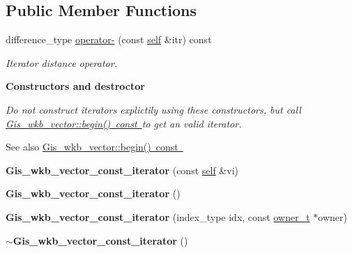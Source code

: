 \subsection*{Public Member Functions}
\begin{DoxyCompactItemize}
\item 
difference\+\_\+type \mbox{\hyperlink{classGis__wkb__vector__const__iterator_a9662de5243a456cb63a183214deba0af}{operator-\/}} (const \mbox{\hyperlink{classGis__wkb__vector__const__iterator}{self}} \&itr) const
\begin{DoxyCompactList}\small\item\em Iterator distance operator. \end{DoxyCompactList}\end{DoxyCompactItemize}
\begin{Indent}\textbf{ Constructors and destroctor}\par
{\em Do not construct iterators explictily using these constructors, but call \mbox{\hyperlink{classGis__wkb__vector_a312062fdc578f38fec1b07912f53963f}{Gis\+\_\+wkb\+\_\+vector\+::begin() const }}to get an valid iterator. \begin{DoxySeeAlso}{See also}
\mbox{\hyperlink{classGis__wkb__vector_a312062fdc578f38fec1b07912f53963f}{Gis\+\_\+wkb\+\_\+vector\+::begin() const }} 
\end{DoxySeeAlso}
}\begin{DoxyCompactItemize}
\item 
\mbox{\label{classGis__wkb__vector__const__iterator_afd819e196ee973846e1569cc48db967b}} 
{\bfseries Gis\+\_\+wkb\+\_\+vector\+\_\+const\+\_\+iterator} (const \mbox{\hyperlink{classGis__wkb__vector__const__iterator}{self}} \&vi)
\item 
\mbox{\label{classGis__wkb__vector__const__iterator_a97fff5959917c434cc921ad0cb8adbc2}} 
{\bfseries Gis\+\_\+wkb\+\_\+vector\+\_\+const\+\_\+iterator} ()
\item 
\mbox{\label{classGis__wkb__vector__const__iterator_a718c20de4cb1e57202f7312e689539c7}} 
{\bfseries Gis\+\_\+wkb\+\_\+vector\+\_\+const\+\_\+iterator} (index\+\_\+type idx, const \mbox{\hyperlink{classGis__wkb__vector}{owner\+\_\+t}} $\ast$owner)
\item 
\mbox{\label{classGis__wkb__vector__const__iterator_a69cd374f5be2ac20e56e1b2b3347bb66}} 
{\bfseries $\sim$\+Gis\+\_\+wkb\+\_\+vector\+\_\+const\+\_\+iterator} ()
\end{DoxyCompactItemize}
\end{Indent}
